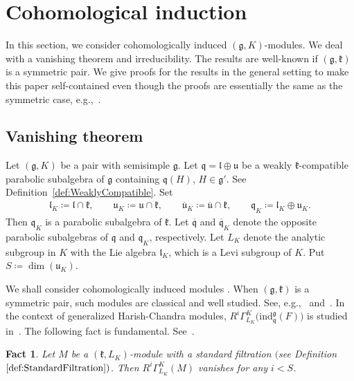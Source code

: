 \documentclass[pdftex]{sigma}
\numberwithin{equation}{section}
\newtheorem{Fact}[Theorem]{Fact}
\theoremstyle{definition}
\newcommand{\lieC}[1]{\mathfrak{#1}}
\newcommand{\lie}[1]{\mathfrak{#1}}
\newcommand{\ind}[2]{\mathrm{ind}^{\lieC{#1}}_{\lieC{#2}}}
\newcommand{\zuck}[2]{\Gamma^{#1}_{#2}}
\newcommand{\Dzuck}[3]{R^{#3}\zuck{#1}{#2}}
\begin{document}
\section{Cohomological induction}

In this section, we consider cohomologically induced $(\lie{g}, K)$-modules.
We deal with a vanishing theorem and irreducibility.
The results are well-known if $(\lie{g}, \lie{k})$ is a symmetric pair.
We give proofs for the results in the general setting to make this paper self-contained
even though the proofs are essentially the same as the symmetric case, e.g.,~\cite[Section~6]{Wa88_real_reductive_I}.

\subsection{Vanishing theorem}

Let $(\lie{g}, K)$ be a pair with semisimple $\lie{g}$.
Let $\lie{q} = \lie{l}\oplus \lie{u}$ be a weakly $\lie{k}$-compatible parabolic subalgebra of $\lie{g}$
containing $\lie{q}(H)$, $H \in \lie{g'}$.
See Definition~\ref{def:WeaklyCompatible}.
Set
\begin{align*}
	\lie{l}_K\coloneq \lie{l}\cap \lie{k}, \qquad \lie{u}_K\coloneq \lie{u}\cap \lie{k}, \qquad \lie{\overline{u}}_K\coloneq \lie{\overline{u}}\cap \lie{k}, \qquad \lie{q}_K\coloneq \lie{l}_K\oplus \lie{u}_K.
\end{align*}
Then $\lie{q}_K$ is a parabolic subalgebra of $\lie{k}$.
Let $\lie{\overline{q}}$ and $\lie{\overline{q}}_K$ denote the opposite parabolic subalgebras of $\lie{q}$ and $\lie{q}_K$, respectively.
Let $L_K$ denote the analytic subgroup in $K$ with the Lie algebra $\lie{l}_K$, which is a Levi subgroup of $K$.
Put $S\coloneq \dim(\lie{u}_K)$.

We shall consider cohomologically induced modules \smash{$\Dzuck{K}{L_K}{i}\bigl(\ind{g}{q}(F)\bigr)$}.
When $(\lie{g}, \lie{k})$ is a symmetric pair, such modules are classical and well studied.
See, e.g.,~\cite{KnVo95_cohomological_induction} and~\cite[Section~6]{Wa88_real_reductive_I}.
In the context of generalized Harish-Chandra modules, $\Dzuck{K}{L_K}{i}\bigl(\ind{g}{q}(F)\bigr)$ is studied in~\cite{PeZu04_generalized_harish_chandra,PeZu12_generalized_harish_chandra}.
The following fact is fundamental.
See~\cite[Lemma~6.4.2]{Wa88_real_reductive_I}.

\begin{Fact}\label{fact:StandardFiltrationVanishing}
	Let $M$ be a $(\lie{k}, L_K)$-module with a standard filtration $($see Definition $\ref{def:StandardFiltration})$.
	Then $\Dzuck{K}{L_K}{i}(M)$ vanishes for any $i < S$.
\end{Fact}
\end{document}
